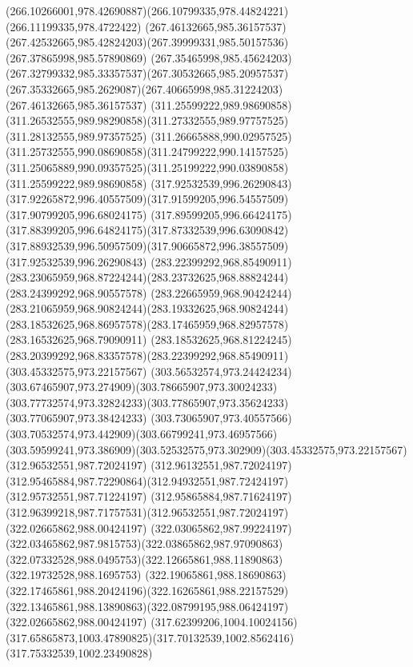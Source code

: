 {{		\curveto(266.10266001,978.42690887)(266.10799335,978.44824221)(266.11199335,978.4722422)
		\moveto(267.46132665,985.36157537)
		\curveto(267.42532665,985.42824203)(267.39999331,985.50157536)(267.37865998,985.57890869)
		\curveto(267.35465998,985.45624203)(267.32799332,985.33357537)(267.30532665,985.20957537)
		\curveto(267.35332665,985.2629087)(267.40665998,985.31224203)(267.46132665,985.36157537)
		\moveto(311.25599222,989.98690858)
		\curveto(311.26532555,989.98290858)(311.27332555,989.97757525)(311.28132555,989.97357525)
		\curveto(311.26665888,990.02957525)(311.25732555,990.08690858)(311.24799222,990.14157525)
		\curveto(311.25065889,990.09357525)(311.25199222,990.03890858)(311.25599222,989.98690858)
		\moveto(317.92532539,996.26290843)
		\curveto(317.92265872,996.40557509)(317.91599205,996.54557509)(317.90799205,996.68024175)
		\curveto(317.89599205,996.66424175)(317.88399205,996.64824175)(317.87332539,996.63090842)
		\curveto(317.88932539,996.50957509)(317.90665872,996.38557509)(317.92532539,996.26290843)
		\moveto(283.22399292,968.85490911)
		\curveto(283.23065959,968.87224244)(283.23732625,968.88824244)(283.24399292,968.90557578)
		\curveto(283.22665959,968.90424244)(283.21065959,968.90824244)(283.19332625,968.90824244)
		\curveto(283.18532625,968.86957578)(283.17465959,968.82957578)(283.16532625,968.79090911)
		\curveto(283.18532625,968.81224245)(283.20399292,968.83357578)(283.22399292,968.85490911)
		\moveto(303.45332575,973.22157567)
		\curveto(303.56532574,973.24424234)(303.67465907,973.274909)(303.78665907,973.30024233)
		\curveto(303.77732574,973.32824233)(303.77865907,973.35624233)(303.77065907,973.38424233)
		\curveto(303.73065907,973.40557566)(303.70532574,973.442909)(303.66799241,973.46957566)
		\curveto(303.59599241,973.386909)(303.52532575,973.302909)(303.45332575,973.22157567)
		\moveto(312.96532551,987.72024197)
		\curveto(312.96132551,987.72024197)(312.95465884,987.72290864)(312.94932551,987.72424197)
		\lineto(312.95732551,987.71224197)
		\curveto(312.95865884,987.71624197)(312.96399218,987.71757531)(312.96532551,987.72024197)
		\moveto(322.02665862,988.00424197)
		\curveto(322.03065862,987.99224197)(322.03465862,987.9815753)(322.03865862,987.97090863)
		\curveto(322.07332528,988.0495753)(322.12665861,988.11890863)(322.19732528,988.1695753)
		\curveto(322.19065861,988.18690863)(322.17465861,988.20424196)(322.16265861,988.22157529)
		\curveto(322.13465861,988.13890863)(322.08799195,988.06424197)(322.02665862,988.00424197)
		\moveto(317.62399206,1004.10024156)
		\curveto(317.65865873,1003.47890825)(317.70132539,1002.8562416)(317.75332539,1002.23490828)
}}
